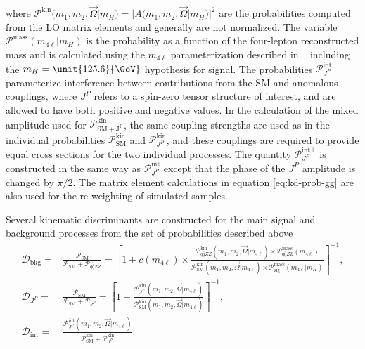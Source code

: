 where $\mathcal{P}^\text{kin}(m_1, m_2, \vec\Omega|m_{H}) = |{A}(m_1, m_2, \vec\Omega|m_{H})|^2$
are the probabilities computed from the LO matrix elements and generally are not normalized.
The variable $\mathcal{P}^\text{mass}(m_{4\ell}|m_{H})$ is the probability as a function of the four-lepton reconstructed mass
and is calculated using the $m_{4\ell}$ parameterization described in ~\cite{Chatrchyan:2012jja, Chatrchyan:2013mxa}
including the $m_{H}=\unit{125.6}{\GeV}$ hypothesis for signal.
The probabilities $\mathcal{P}_{J^P} ^\text{int}$ parameterize interference between contributions from the SM and
anomalous couplings, where $J^P$ refers to a spin-zero tensor structure of interest, and are allowed to have both positive
and negative values. In the calculation of the mixed amplitude used for $\mathcal{P}^\text{kin}_\mathrm{SM + J^P}$,
the same coupling strengths are used as in the individual probabilities $\mathcal{P}^\text{kin}_\mathrm{SM}$ and $\mathcal{P}^\text{kin}_{J^P}$,
and these couplings are required to provide equal cross sections for the two individual processes.
The quantity $\mathcal{P}_{J^P} ^{\text{int}\perp}$ is constructed in the same way
as $\mathcal{P}_{J^P} ^\text{int}$ except that the phase of the $J^P$ amplitude is changed by $\pi/2$.
The matrix element calculations in equation \eqref{eq:kd-prob-gg} are also used for the re-weighting of simulated samples.

Several kinematic discriminants are constructed for the main signal and background processes
from the set of probabilities described above
\begin{equation}\begin{aligned}
 \mathcal{D}_\text{bkg} =& \frac{\mathcal{P}_\mathrm{SM} }{\mathcal{P}_\mathrm{SM} +\mathcal{P}_{q\bar{q}ZZ} }=
\left[1+c(m_{4\ell})\times\frac{\mathcal{P}^\text{kin}_{q\bar{q}ZZ} (m_1, m_2, \vec\Omega | m_{4\ell})\times \mathcal{P}^\text{mass}_{q\bar{q}ZZ} (m_{4\ell})  }
{\mathcal{P}^\text{kin}_\mathrm{SM} (m_1, m_2, \vec\Omega | m_{4\ell}) \times \mathcal{P}^\text{mass}_\text{sig} (m_{4\ell}|m_{H}) } \right]^{-1} ,
 \\
\mathcal{D}_{J^P} =& \frac{\mathcal{P}_\mathrm{SM} }{\mathcal{P}_\mathrm{SM} + \mathcal{P}_{J^P} }=
\left[1+ \frac{\mathcal{P}^\text{kin}_{J^P} (m_1, m_2, \vec\Omega | m_{4\ell}) }
{\mathcal{P}^\text{kin}_\mathrm{SM} (m_1, m_2, \vec\Omega | m_{4\ell}) } \right]^{-1} ,
 \\
\mathcal{D}_\text{int} =& \frac{ \mathcal{P}_{J^P}^\text{int}(m_1, m_2, \vec\Omega | m_{4\ell})}
{\mathcal{P}^\text{kin}_\mathrm{SM} +\mathcal{P}^\text{kin}_{J^P} }  .
\end{aligned}\end{equation}

